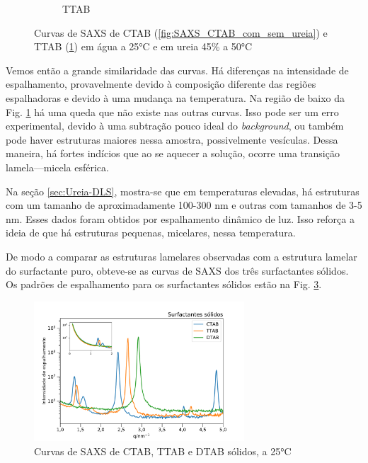 \begin{figure}[H]
\begin{subfigure}[t]{0.45\textwidth}
			\caption{TTAB}
			\label{fig:SAXS_TTAB_com_sem_ureia}
		\end{subfigure}
		\caption{Curvas de SAXS de CTAB (\ref{fig:SAXS_CTAB_com_sem_ureia}) e TTAB (\ref{fig:SAXS_TTAB_com_sem_ureia}) em água a 25°C e em ureia 45\% a 50°C}
		\label{fig:SAXS_com_sem_ureia}
	\end{figure}
	
	Vemos então a grande similaridade das curvas. Há diferenças na intensidade de espalhamento, provavelmente devido à composição diferente das regiões espalhadoras e devido à uma mudança na temperatura. Na região de baixo \q{} da Fig. \ref{fig:SAXS_TTAB_com_sem_ureia} há uma queda que não existe nas outras curvas. Isso pode ser um erro experimental, devido à uma subtração pouco ideal do \emph{background}, ou também pode haver estruturas maiores nessa amostra, possivelmente vesículas. Dessa maneira, há fortes indícios que ao se aquecer a solução, ocorre uma transição lamela---micela esférica.
	
	Na seção \ref{sec:Ureia-DLS}, mostra-se que em temperaturas elevadas, há estruturas com um tamanho de aproximadamente 100-300 nm e outras com tamanhos de 3-5 nm. Esses dados foram obtidos por espalhamento dinâmico de luz. Isso reforça a ideia de que há estruturas pequenas, micelares, nessa temperatura.

	 
	De modo a comparar as estruturas lamelares observadas com a estrutura lamelar do surfactante puro, obteve-se as curvas de SAXS dos três surfactantes sólidos. Os padrões de espalhamento para os surfactantes sólidos estão na Fig. \ref{fig:SAXS_surf_sólido}.

	\begin{figure}[H]
		\centering
		\includegraphics[width=0.7\textwidth]{imagens/saxs/surfactante_solido}
		\caption{Curvas de SAXS de CTAB, TTAB e DTAB sólidos, a 25°C}
		\label{fig:SAXS_surf_sólido}
	\end{figure}  %
	
